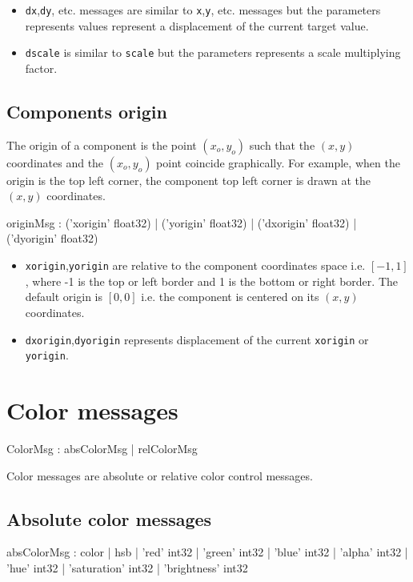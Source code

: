 \documentclass[a4paper,twoside]{report}
\newcommand{\sublevel}[1]	{\section{#1}}
\newcommand{\subsublevel}[1]	{\subsection{#1}}
\newcommand{\OSC}[1]		{\texttt{#1}}
\begin{document}
\begin{itemize}
\item \OSC{dx},\OSC{dy}, etc. messages are similar to \OSC{x},\OSC{y}, etc. messages but the parameters represents values represent a displacement of the current target value.
\item \OSC{dscale} is similar to \OSC{scale} but the parameters represents a scale multiplying factor.
\end{itemize}

\subsublevel{Components origin}
\label{origin}

The origin of a component is the point $(x_o, y_o)$ such that the $(x, y)$ coordinates and the $(x_o, y_o)$ point coincide graphically. For example, when the origin is the top left corner, the component top left corner is drawn  at the $(x, y)$ coordinates.

\begin{rail}
originMsg :  
			('xorigin' float32)
		| 	('yorigin' float32)
		| 	('dxorigin' float32)
		| 	('dyorigin' float32)
\end{rail}

\begin{itemize}
\item \OSC{xorigin},\OSC{yorigin} are relative to the component coordinates space i.e. $[-1,1]$, where -1 is the top or left border and 1 is the bottom or right border. The default origin is $[0,0]$ i.e. the component is centered on its $(x,y)$ coordinates.
\item \OSC{dxorigin},\OSC{dyorigin} represents displacement of the current \OSC{xorigin} or \OSC{yorigin}.
\end{itemize}



\sublevel{Color messages}
\label{colormsg}


\begin{rail}
ColorMsg : 	absColorMsg 
			|	relColorMsg 
\end{rail}

Color messages are absolute or relative color control messages.

\subsublevel{Absolute color messages}

\begin{rail}
absColorMsg :    color
			| hsb
			| 'red' int32
			| 'green' int32
			| 'blue' int32
			| 'alpha' int32
			| 'hue' int32
			| 'saturation' int32
			| 'brightness' int32
\end{rail}
\end{document}
